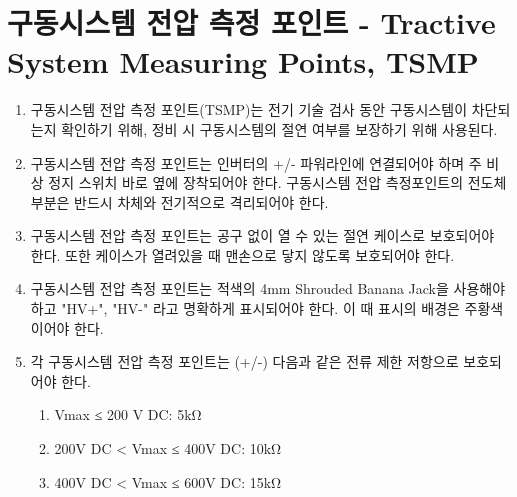 \documentclass[final,a4paper,10pt]{report}
\begin{document}
\section{구동시스템 전압 측정 포인트 - Tractive System Measuring Points, TSMP}\label{rule:formula-technical.tractive-system-measuring-points} \label{section:TSMP}
\begin{enumerate}
  \item\label{rule:formula-technical.tractive-system-measuring-points.purpose} 구동시스템 전압 측정 포인트(TSMP)는 전기 기술 검사 동안 구동시스템이 차단되는지 확인하기 위해, 정비 시 구동시스템의 절연 여부를 보장하기 위해 사용된다.
  \item\label{rule:formula-technical.tractive-system-measuring-points.wiring-mounting-isolation} 구동시스템 전압 측정 포인트는 인버터의 +/- 파워라인에 연결되어야 하며 주 비상 정지 스위치 바로 옆에 장착되어야 한다. 구동시스템 전압 측정포인트의 전도체 부분은 반드시 차체와 전기적으로 격리되어야 한다.
  \item\label{rule:formula-technical.tractive-system-measuring-points.tool-free-insulated-case} 구동시스템 전압 측정 포인트는 공구 없이 열 수 있는 절연 케이스로 보호되어야 한다. 또한 케이스가 열려있을 때 맨손으로 닿지 않도록 보호되어야 한다.
  \item\label{rule:formula-technical.tractive-system-measuring-points.red-jack-hv-label} 구동시스템 전압 측정 포인트는 적색의 4mm Shrouded Banana Jack을 사용해야 하고 "HV+", "HV-" 라고 명확하게 표시되어야 한다. {\color{blue}이 때 표시의 배경은 주황색이어야 한다.}

  \item\label{rule:formula-technical.tractive-system-measuring-points.current-limiting-resistor} 각 구동시스템 전압 측정 포인트는 (+/-) 다음과 같은 전류 제한 저항으로 보호되어야 한다. \label{item:TSMP 전류 제한 저항}
    \begin{enumerate}
      \item\label{rule:formula-technical.tractive-system-measuring-points.current-limiting-resistor.max-200v-5kohm} Vmax ≤ 200 V DC: 5kΩ
      \item\label{rule:formula-technical.tractive-system-measuring-points.current-limiting-resistor.max-400v-10kohm} 200V DC < Vmax ≤ 400V DC: 10kΩ
      \item\label{rule:formula-technical.tractive-system-measuring-points.current-limiting-resistor.max-600v-15kohm} 400V DC < Vmax ≤ 600V DC: 15kΩ
    \end{enumerate}



\end{enumerate}
\end{document}
